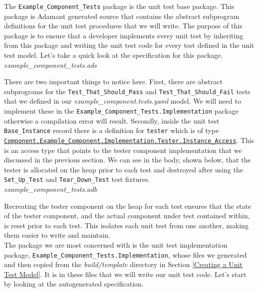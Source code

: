 The \texttt{Example\_Component\_Tests} package is the unit test base package. This package is Adamant generated source that contains the abstract subprogram definitions for the unit test procedures that we will write. The purpose of this package is to ensure that a developer implements every unit test by inheriting from this package and writing the unit test code for every test defined in the unit test model. Let's take a quick look at the specification for this package. \\

\textit{example\_component\_tests.ads}

There are two important things to notice here. First, there are abstract subprograms for the \texttt{Test\_That\_Should\_Pass} and \texttt{Test\_That\_Should\_Fail} tests that we defined in our \textit{example\_component.tests.yaml} model. We will need to implement these in the \texttt{Example\_Component\_Tests.Implementation} package otherwise a compilation error will result. Secondly, inside the unit test \texttt{Base\_Instance} record there is a definition for \texttt{tester} which is of type \texttt{\url{Component.Example\_Component.Implementation.Tester.Instance\_Access}}. This is an access type that points to the tester component implementation that we discussed in the previous section. We can see in the body, shown below, that the tester is allocated on the heap prior to each test and destroyed after using the \texttt{Set\_Up\_Test} and \texttt{Tear\_Down\_Test} test fixtures. \\

\textit{example\_component\_tests.adb}

Recreating the tester component on the heap for each test ensures that the state of the tester component, and the actual component under test contained within, is reset prior to each test. This isolates each unit test from one another, making them easier to write and maintain. \\

The package we are most concerned with is the unit test implementation package, \texttt{Example\_Component\_Tests.Implementation}, whose files we generated and then copied from the \textit{build/template} directory in Section \ref{Creating a Unit Test Model}. It is in these files that we will write our unit test code. Let's start by looking at the autogenerated specification. \\

